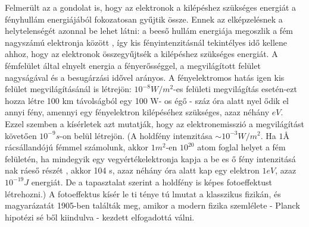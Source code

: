 \documentclass[../main.tex]{subfiles}
\begin{document}
Felmerült az a gondolat is, hogy az elektronok a kilépéshez szükséges energiát a fényhullám energiájából fokozatosan gyűjtik össze. Ennek az elképzelésnek a helytelenségét azonnal be lehet látni: a beeső hullám energiája
megoszlik a fém nagyszámú elektronja között , így kis fényintenzitásnál tekintélyes idő kellene ahhoz, hogy az elektronok összegyűjtsék a kilépéshez szükséges energiát. A fémfelület által elnyelt energia a fényerősséggel,
a megvilágított felület nagyságával és a besugárzási idővel arányos. A fényelektromos hatás igen kis felület megvilágításánál is létrejön: $10^{-8} W/m^2$-es felületi megvilágítás esetén-ezt hozza létre 100 km távolságból egy 100 W-
os égő - száz óra alatt nyel ődik el annyi fény, amennyi egy fényelektron kilépéséhez szükséges, azaz néhány $eV$. Ezzel szemben a kísérletek azt mutatják, hogy az elektronemisszió a megvilágítást követően $10^{-9} s$-on belül
létrejön. (A holdfény intenzitása $\sim 10^{-3} W/m^2$. Ha $1 \text{\AA}$ rácsállandójú fémmel számolunk, akkor $1 m^2$-en $10^{20}$ atom foglal helyet a fém felületén, ha mindegyik egy vegyértékelektronja kapja a be es ő fény intenzitásá nak ráeső részét , akkor 104 s, azaz néhány óra alatt kap egy elektron $1 eV$, azaz
$10^{-19} J$ energiát. De a tapasztalat szerint a holdfény is képes fotoeffektust létrehozni.) A fotoeffektus kísér le ti ténye tú lmutat a klasszikus fizikán, és magyarázatát 1905-ben találták meg, amikor a modern fizika szemlélete -
Planck hipotézi sé ből kiindulva - kezdett elfogadottá válni.
\end{document}
